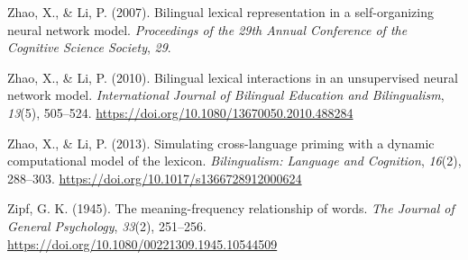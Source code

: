 \documentclass[
  12pt,
  b5paperpaper,
  twoside]{scrreprt}
\newlength{\cslhangindent}
\newlength{\cslentryspacingunit} %
\newenvironment{CSLReferences}[2] %
 {%
  \setlength{\parindent}{0pt}
  \ifodd #1
  \let\oldpar\par
  \def\par{\hangindent=\cslhangindent\oldpar}
  \fi
  \setlength{\parskip}{#2\cslentryspacingunit}
 }%
 {}
\begin{document}
\begin{CSLReferences}{1}{0}
\leavevmode{}%
Zhao, X., \& Li, P. (2007). Bilingual lexical representation in a
self-organizing neural network model. \emph{Proceedings of the 29th
{Annual Conference} of the {Cognitive Science Society}}, \emph{29}.

\leavevmode{}%
Zhao, X., \& Li, P. (2010). Bilingual lexical interactions in an
unsupervised neural network model. \emph{International Journal of
Bilingual Education and Bilingualism}, \emph{13}(5), 505--524.
\url{https://doi.org/10.1080/13670050.2010.488284}

\leavevmode{}%
Zhao, X., \& Li, P. (2013). Simulating cross-language priming with a
dynamic computational model of the lexicon. \emph{Bilingualism: Language
and Cognition}, \emph{16}(2), 288--303.
\url{https://doi.org/10.1017/s1366728912000624}

\leavevmode{}%
Zipf, G. K. (1945). The meaning-frequency relationship of words.
\emph{The Journal of General Psychology}, \emph{33}(2), 251--256.
\url{https://doi.org/10.1080/00221309.1945.10544509}

\end{CSLReferences}

\endgroup
\end{document}

